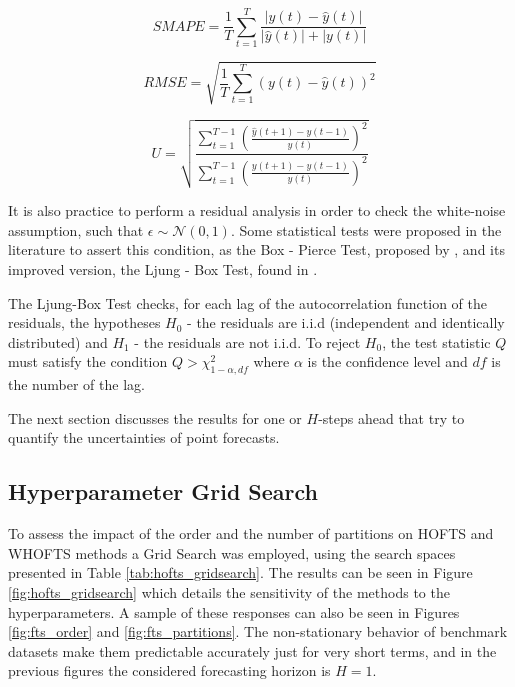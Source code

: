 \begin{equation}
SMAPE = \frac{1}{T} \sum_{t=1}^T  \frac{|y(t) - \hat{y}(t)|}{|\hat{y}(t)| +  |y(t)|} 
\label{eqn:smape}
\end{equation}

\begin{equation}
RMSE = \sqrt{\frac{1}{T}\sum_{t=1}^T (y(t) - \hat{y}(t))^2}
\label{eqn:rmse}
\end{equation}

\begin{equation}
U = \sqrt{\frac{\sum_{t=1}^{T-1} \left( \frac{\hat{y}(t+1)-y(t-1)}{y(t)} \right)^2}{\sum_{t=1}^{T-1} \left( \frac{y(t+1)-y(t-1)}{y(t)} \right)^2}}
\label{eqn:theilu}
\end{equation}
  
It is also practice to perform a residual analysis in order to check the white-noise  assumption, such that $\epsilon \sim \mathcal{N}(0,1)$. Some statistical tests were proposed in the literature to assert this condition, as the  Box - Pierce Test, proposed by \cite{Box1970}, and its improved version, the Ljung - Box Test, found in \cite{Ljung1978}.

The Ljung-Box Test checks, for each lag of the autocorrelation function of the residuals, the hypotheses $H_0$ - the residuals are i.i.d (independent and identically distributed) and $H_1$ - the residuals are not i.i.d. To reject $H_0$, the test statistic $Q$ must satisfy the condition $Q > \chi^2_{1-\alpha,df}$ where $\alpha$ is the confidence level and $df$ is the number of the lag. 

The next section discusses the results for one or $H$-steps ahead that try to quantify the uncertainties of point forecasts.

\subsection{Hyperparameter Grid Search}
\label{sec:fts_gridsearch}

To assess the impact of the order and the number of partitions on HOFTS and WHOFTS methods a Grid Search was employed, using the search spaces presented in Table \ref{tab:hofts_gridsearch}. The results can be seen in Figure \ref{fig:hofts_gridsearch} which details the sensitivity of the methods to the hyperparameters. A sample of these responses can also be seen in Figures \ref{fig:fts_order} and \ref{fig:fts_partitions}. The non-stationary behavior of benchmark datasets make them predictable accurately just for very short terms, and in the previous figures the considered forecasting horizon is $H=1$.

